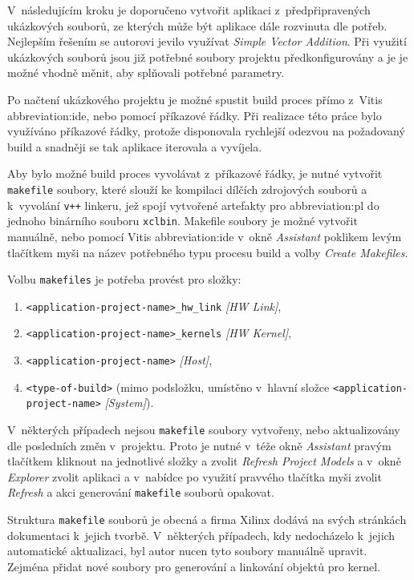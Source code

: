 \documentclass[a4paper, twoside, 11pt]{article}
\begin{document}
		V~následujícím kroku je doporučeno vytvořit aplikaci z~předpřipravených ukázkových souborů, ze kterých může být aplikace dále rozvinuta dle potřeb. Nejlepším řešením se autorovi jevilo využívat \textit{Simple Vector Addition}. Při využití ukázkových souborů jsou již potřebné soubory projektu předkonfigurovány a je je možné vhodně měnit, aby splňovali potřebné parametry.\par
		Po načtení ukázkového projektu je možné spustit build proces přímo z~Vitis \gls{abbreviation:ide}, nebo pomocí příkazové řádky. Při realizace této práce bylo využíváno příkazové řádky, protože disponovala rychlejší odezvou na požadovaný build a snadněji se tak aplikace iterovala a vyvíjela.\par
		Aby bylo možné build proces vyvolávat z~příkazové řádky, je nutné vytvořit \texttt{makefile} soubory, které slouží ke kompilaci dílčích zdrojových souborů a k~vyvolání \texttt{v++} linkeru, jež spojí vytvořené artefakty pro \gls{abbreviation:pl} do jednoho binárního souboru \texttt{xclbin}. Makefile soubory je možné vytvořit manuálně, nebo pomocí Vitis \gls{abbreviation:ide} v~okně \textit{Assistant} poklikem levým tlačítkem myši na název potřebného typu procesu build a volby \textit{Create Makefiles}.\par
		\vspace*{0.35cm}
		Volbu \texttt{makefiles} je potřeba provést pro složky:
		\begin{enumerate}
			\item \texttt{<application-project-name>\_hw\_link} \textit{[HW Link]},
			\item \texttt{<application-project-name>\_kernels} \textit{[HW Kernel]},
			\item \texttt{<application-project-name>} \textit{[Host]},
			\item \texttt{<type-of-build>} (mimo podsložku, umístěno v~hlavní složce \texttt{<application-project-name>} \textit{[System]}).
		\end{enumerate}
		\vspace*{0.75cm}
		V~některých případech nejsou \texttt{makefile} soubory vytvořeny, nebo aktualizovány dle posledních změn v~projektu. Proto je nutné v~téže okně \textit{Assistant} pravým tlačítkem kliknout na jednotlivé složky a zvolit \textit{Refresh Project Models} a v~okně \textit{Explorer} zvolit aplikaci a v~nabídce po využití pravvého tlačítka myši zvolit \textit{Refresh} a akci generování \texttt{makefile} souborů opakovat.\par
		Struktura \texttt{makefile} souborů je obecná a firma Xilinx dodává na svých stránkách dokumentaci k~jejich tvorbě. V~některých případech, kdy nedocházelo k~jejich automatické aktualizaci, byl autor nucen tyto soubory manuálně upravit. Zejména přidat nové soubory pro generování a linkování objektů pro kernel.\par
\end{document}
